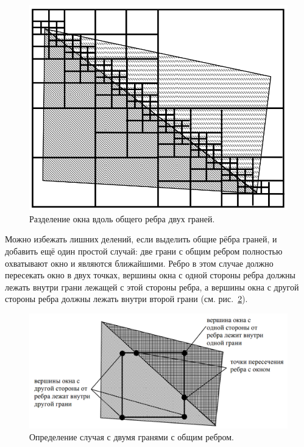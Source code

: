 \begin{figure}[H]
    \centering
    \includegraphics[width=\textwidth]{img/varnak_algorithm_4.png}
    \caption{Разделение окна вдоль общего ребра двух граней.}
    \label{fig:varnak_algorithm_4}
\end{figure}

Можно избежать лишних делений, если выделить общие рёбра граней, и добавить ещё один простой случай: две грани с общим ребром полностью охватывают окно и являются ближайшими. Ребро в этом случае
должно пересекать окно в двух точках, вершины окна с одной стороны
ребра должны лежать внутри грани лежащей с этой стороны ребра, а вершины окна с другой стороны ребра должны лежать внутри второй грани
(см. рис.~\ref{fig:varnak_algorithm_5}).

\begin{figure}[H]
    \centering
    \includegraphics[width=\textwidth]{img/varnak_algorithm_5.png}
    \caption{Определение случая с двумя гранями с общим ребром.}
    \label{fig:varnak_algorithm_5}
\end{figure}

